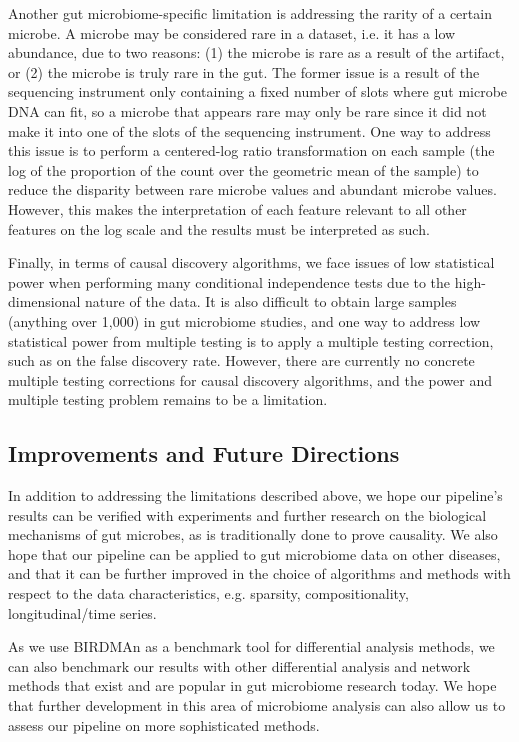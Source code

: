 \documentclass[12pt,letterpaper]{article}
\begin{document}
Another gut microbiome-specific limitation is addressing the rarity of a certain microbe. A microbe may be considered rare in a dataset, i.e. it has a low abundance, due to two reasons: (1) the microbe is rare as a result of the artifact, or (2) the microbe is truly rare in the gut. The former issue is a result of the sequencing instrument only containing a fixed number of slots where gut microbe DNA can fit, so a microbe that appears rare may only be rare since it did not make it into one of the slots of the sequencing instrument. One way to address this issue is to perform a centered-log ratio transformation on each sample (the log of the proportion of the count over the geometric mean of the sample) to reduce the disparity between rare microbe values and abundant microbe values. However, this makes the interpretation of each feature relevant to all other features on the log scale and the results must be interpreted as such. 

Finally, in terms of causal discovery algorithms, we face issues of low statistical power when performing many conditional independence tests due to the high-dimensional nature of the data. It is also difficult to obtain large samples (anything over 1,000) in gut microbiome studies, and one way to address low statistical power from multiple testing is to apply a multiple testing correction, such as on the false discovery rate. However, there are currently no concrete multiple testing corrections for causal discovery algorithms, and the power and multiple testing problem remains to be a limitation.


\subsection{Improvements and Future Directions}

In addition to addressing the limitations described above, we hope our pipeline’s results can be verified with experiments and further research on the biological mechanisms of gut microbes, as is traditionally done to prove causality. We also hope that our pipeline can be applied to gut microbiome data on other diseases, and that it can be further improved in the choice of algorithms and methods with respect to the data characteristics, e.g. sparsity, compositionality, longitudinal/time series. 

As we use BIRDMAn as a benchmark tool for differential analysis methods, we can also benchmark our results with other differential analysis and network methods that exist and are popular in gut microbiome research today. We hope that further development in this area of microbiome analysis can also allow us to assess our pipeline on more sophisticated methods. 
\end{document}
